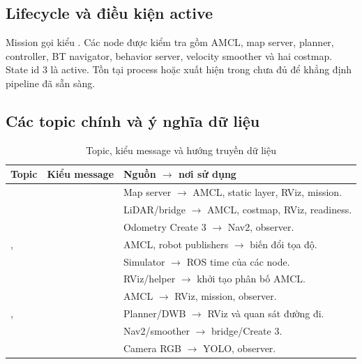 \subsection{Lifecycle và điều kiện active}
Mission gọi  kiểu . Các node được kiểm tra gồm AMCL, map server, planner, controller, BT navigator, behavior server, velocity smoother và hai costmap. State id 3 là active. Tồn tại process hoặc xuất hiện trong  chưa đủ để khẳng định pipeline đã sẵn sàng.
\clearpage

\subsection{Các topic chính và ý nghĩa dữ liệu}
\begin{table}[H]\centering\footnotesize
\caption{Topic, kiểu message và hướng truyền dữ liệu}\label{tab:topics}
\begin{tabularx}{\linewidth}{@{}P{4.3cm}P{4.2cm}Y@{}}\toprule
Topic&Kiểu message&Nguồn $\rightarrow$ nơi sử dụng\\\midrule
{}&&Map server $\rightarrow$ AMCL, static layer, RViz, mission.\\
&&LiDAR/bridge $\rightarrow$ AMCL, costmap, RViz, readiness.\\
&&Odometry Create 3 $\rightarrow$ Nav2, observer.\\
, &&AMCL, robot publishers $\rightarrow$ biến đổi tọa độ.\\
&&Simulator $\rightarrow$ ROS time của các node.\\
&&RViz/helper $\rightarrow$ khởi tạo phân bố AMCL.\\
&&AMCL $\rightarrow$ RViz, mission, observer.\\
, &&Planner/DWB $\rightarrow$ RViz và quan sát đường đi.\\
&&Nav2/smoother $\rightarrow$ bridge/Create 3.\\
&&Camera RGB $\rightarrow$ YOLO, observer.\\

\end{tabularx}
\end{table}
